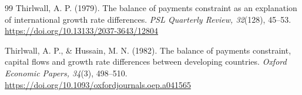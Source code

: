 \documentclass[11pt]{article}
\begin{document}
\begin{thebibliography}{99}
Thirlwall, A. P. (1979). The balance of payments constraint as an explanation of international growth rate differences. \textit{PSL Quarterly Review, 32}(128), 45--53. \url{https://doi.org/10.13133/2037-3643/12804}

Thirlwall, A. P., \& Hussain, M. N. (1982). The balance of payments constraint, capital flows and growth rate differences between developing countries. \textit{Oxford Economic Papers, 34}(3), 498--510. \url{https://doi.org/10.1093/oxfordjournals.oep.a041565}

\end{thebibliography}
\end{document}

